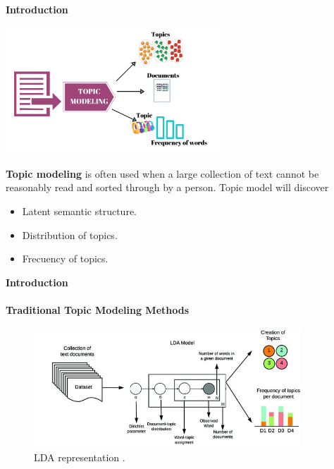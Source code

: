 \titleframe


\begin{frame}{\large \textbf{Introduction}}

  \begin{minipage}{8.2cm}
    \includegraphics[width=8cm]{Graphics/topic_modeling.png}
  \end{minipage}
  \begin{minipage}{5cm}
    \textbf{Topic modeling} is often used when a large collection of text cannot be reasonably read and sorted through by a person. Topic model will discover
    \begin{itemize}
      \item Latent semantic structure.
      \item Distribution of topics.
      \item Frecuency of topics.
    \end{itemize}
  \end{minipage}

\end{frame}


\begin{frame}[fragile=singleslide]{\large \textbf{Introduction}}
  \framesubtitle{Traditional Topic Modeling Methods}
  \begin{figure}[ht!]
    \includegraphics[width=10cm]{Graphics/LDA.jpg}
    \caption{LDA representation \cite{Buenano_Fernandez_2020}.}
  \end{figure}
\end{frame}

